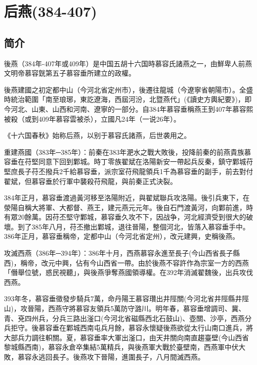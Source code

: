 

\section{后燕\tiny(384-407)}

\subsection{简介}

後燕（384年-407年或409年）是中国五胡十六国時慕容氏諸燕之一，由鮮卑人前燕文明帝慕容皝第五子慕容垂所建立的政權。

後燕建國之初定都中山（今河北省定州市），後遷往龍城（今遼寧省朝陽市）。全盛時統治範圍「南至琅琊，東訖遼海，西屆河汾，北暨燕代」(《讀史方輿紀要》)，即今河北、山東、山西和河南、遼寧的一部分。自384年慕容垂稱燕王到407年慕容熙被殺（或到409年慕容雲被杀），立國凡24年（一说26年）。

《十六国春秋》始称后燕，以别于慕容氏諸燕，后世袭用之。

重建燕國（383年─385年）：前秦在383年淝水之戰大敗後，投降前秦的前燕貴族慕容垂在苻堅同意下回到鄴城。時丁零族翟斌在洛陽新安一帶起兵反秦，鎮守鄴城苻堅庶長子苻丕撥兵2千給慕容垂，派宗室苻飛龍領兵1千為慕容垂的副手，前去對付翟斌，但慕容垂於行軍中襲殺苻飛龍，與前秦正式決裂。

384年正月，慕容垂渡過黃河移至洛陽附近，與翟斌聯兵攻洛陽。後引兵東下，在滎陽自稱大將軍、大都督、燕王，建元燕元元年。後自石門渡黃河，向鄴前進，時有眾20餘萬。因苻丕堅守鄴城，慕容垂久攻不下，因战争，河北經濟受到很大的破壞。到了385年八月，苻丕撤出鄴城，退往晉陽，整個河北，皆落入慕容垂手中。386年正月，慕容垂稱帝，定都中山（今河北省定州），改元建興，史稱後燕。

攻滅西燕（386年─394年）：386年十月，西燕慕容永進至長子(今山西省長子縣西)，稱帝，改元中興，佔有今山西省一帶。由於後燕不容許作為宗室一方的西燕「僭舉位號，惑民視聽」，與後燕爭奪燕國領導權。在392年消滅翟魏後，出兵攻伐西燕。

393年冬，慕容垂徵發步騎兵7萬，命丹陽王慕容瓚出井陘關(今河北省井陘縣井陘山)，攻晉陽，西燕守將慕容友領兵5萬防守潞川。明年春，慕容垂增調司、冀、青、兗四州兵，分兵三路出滏口(今河北省磁縣西北石鼓山)、壺關、沙亭，西燕分兵拒守。後慕容垂在鄴城西南屯兵月餘，慕容永懷疑後燕欲從太行山南口進兵，將大部兵力調往軹關。夏，慕容垂率大軍出滏口，由天井關向南直趨臺壁(今山西省黎城縣西南)，慕容永倉卒集結5萬精兵，與後燕軍大戰於臺壁南，西燕軍中伏大敗，慕容永逃回長子。後燕攻下晉陽，進圍長子，八月間滅西燕。

